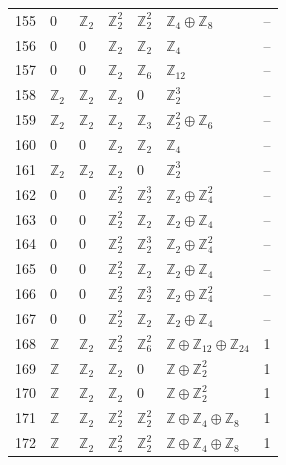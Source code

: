 \documentclass[10pt]{article}
\begin{document}
\begin{longtable}{rlllllr}
155 & $0$ & $\mathbb{Z}_{2}$ & $\mathbb{Z}_{2}^{2}$ & $\mathbb{Z}_{2}^{2}$ & $\mathbb{Z}_{4}\oplus \mathbb{Z}_{8}$ & -- \\
156 & $0$ & $0$ & $\mathbb{Z}_{2}$ & $\mathbb{Z}_{2}$ & $\mathbb{Z}_{4}$ & -- \\
157 & $0$ & $0$ & $\mathbb{Z}_{2}$ & $\mathbb{Z}_{6}$ & $\mathbb{Z}_{12}$ & -- \\
158 & $\mathbb{Z}_{2}$ & $\mathbb{Z}_{2}$ & $\mathbb{Z}_{2}$ & $0$ & $\mathbb{Z}_{2}^{3}$ & -- \\
159 & $\mathbb{Z}_{2}$ & $\mathbb{Z}_{2}$ & $\mathbb{Z}_{2}$ & $\mathbb{Z}_{3}$ & $\mathbb{Z}_{2}^{2}\oplus \mathbb{Z}_{6}$ & -- \\
160 & $0$ & $0$ & $\mathbb{Z}_{2}$ & $\mathbb{Z}_{2}$ & $\mathbb{Z}_{4}$ & -- \\
161 & $\mathbb{Z}_{2}$ & $\mathbb{Z}_{2}$ & $\mathbb{Z}_{2}$ & $0$ & $\mathbb{Z}_{2}^{3}$ & -- \\
162 & $0$ & $0$ & $\mathbb{Z}_{2}^{2}$ & $\mathbb{Z}_{2}^{3}$ & $\mathbb{Z}_{2}\oplus \mathbb{Z}_{4}^{2}$ & -- \\
163 & $0$ & $0$ & $\mathbb{Z}_{2}^{2}$ & $\mathbb{Z}_{2}$ & $\mathbb{Z}_{2}\oplus \mathbb{Z}_{4}$ & -- \\
164 & $0$ & $0$ & $\mathbb{Z}_{2}^{2}$ & $\mathbb{Z}_{2}^{3}$ & $\mathbb{Z}_{2}\oplus \mathbb{Z}_{4}^{2}$ & -- \\
165 & $0$ & $0$ & $\mathbb{Z}_{2}^{2}$ & $\mathbb{Z}_{2}$ & $\mathbb{Z}_{2}\oplus \mathbb{Z}_{4}$ & -- \\
166 & $0$ & $0$ & $\mathbb{Z}_{2}^{2}$ & $\mathbb{Z}_{2}^{3}$ & $\mathbb{Z}_{2}\oplus \mathbb{Z}_{4}^{2}$ & -- \\
167 & $0$ & $0$ & $\mathbb{Z}_{2}^{2}$ & $\mathbb{Z}_{2}$ & $\mathbb{Z}_{2}\oplus \mathbb{Z}_{4}$ & -- \\
168 & $\mathbb{Z}$ & $\mathbb{Z}_{2}$ & $\mathbb{Z}_{2}^{2}$ & $\mathbb{Z}_{6}^{2}$ & $\mathbb{Z}\oplus \mathbb{Z}_{12}\oplus \mathbb{Z}_{24}$ & 1 \\
169 & $\mathbb{Z}$ & $\mathbb{Z}_{2}$ & $\mathbb{Z}_{2}$ & $0$ & $\mathbb{Z}\oplus \mathbb{Z}_{2}^{2}$ & 1 \\
170 & $\mathbb{Z}$ & $\mathbb{Z}_{2}$ & $\mathbb{Z}_{2}$ & $0$ & $\mathbb{Z}\oplus \mathbb{Z}_{2}^{2}$ & 1 \\
171 & $\mathbb{Z}$ & $\mathbb{Z}_{2}$ & $\mathbb{Z}_{2}^{2}$ & $\mathbb{Z}_{2}^{2}$ & $\mathbb{Z}\oplus \mathbb{Z}_{4}\oplus \mathbb{Z}_{8}$ & 1 \\
172 & $\mathbb{Z}$ & $\mathbb{Z}_{2}$ & $\mathbb{Z}_{2}^{2}$ & $\mathbb{Z}_{2}^{2}$ & $\mathbb{Z}\oplus \mathbb{Z}_{4}\oplus \mathbb{Z}_{8}$ & 1 \\

\end{longtable}
\end{document}
